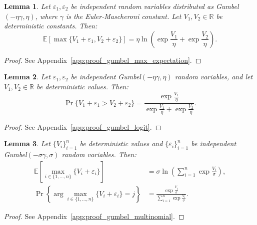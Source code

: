 \documentclass[12pt]{article}
\theoremstyle{plain}
\newtheorem{lemma}{Lemma}
\begin{document}
\begin{lemma}
	\label{lem:gumbel_max_expectation}
	Let $\varepsilon_1, \varepsilon_2$ be independent random variables distributed as Gumbel$(-\eta\gamma, \eta)$, where $\gamma$ is the Euler-Mascheroni constant. Let $V_1, V_2 \in \mathbb{R}$ be deterministic constants. Then:
	\begin{equation}
		\mathbb{E}\left[\max\{V_1 + \varepsilon_1, V_2 + \varepsilon_2\}\right] = \eta \ln\left( \exp\frac{V_1}{\eta} + \exp\frac{V_2}{\eta} \right).
	\end{equation}
\end{lemma}

\begin{proof}
	See Appendix~\ref{app:proof_gumbel_max_expectation}.
\end{proof}

\begin{lemma}
	\label{lem:gumbel_logit}
	Let $\varepsilon_1, \varepsilon_2$ be independent Gumbel$(-\eta\gamma, \eta)$ random variables, and let $V_1, V_2 \in \mathbb{R}$ be deterministic values. Then:
	\begin{equation}
		\Pr\{V_1 + \varepsilon_1 > V_2 + \varepsilon_2\} = \frac{\exp\frac{V_1}{\eta}}{\exp\frac{V_1}{\eta} + \exp\frac{V_2}{\eta}}.
	\end{equation}
\end{lemma}

\begin{proof}
	See Appendix~\ref{app:proof_gumbel_logit}.
\end{proof}

\begin{lemma}
	\label{lem:gumbel_multinomial}
	Let $\{V_i\}_{i=1}^n$ be deterministic values and $\{\varepsilon_i\}_{i=1}^n$ be independent Gumbel$(-\sigma\gamma, \sigma)$ random variables. Then:
	\begin{align}
		\mathbb{E}\left[\max_{i \in \{1,\ldots,n\}} \{V_i + \varepsilon_i\}\right]    & = \sigma \ln\left( \sum_{i=1}^n \exp\frac{V_i}{\sigma} \right),       \\
		\Pr\left\{\arg\max_{i \in \{1,\ldots,n\}} \{V_i + \varepsilon_i\} = j\right\} & = \frac{\exp\frac{V_j}{\sigma}}{\sum_{i=1}^n \exp\frac{V_i}{\sigma}}.
	\end{align}
\end{lemma}

\begin{proof}
	See Appendix~\ref{app:proof_gumbel_multinomial}.
\end{proof}
\end{document}
